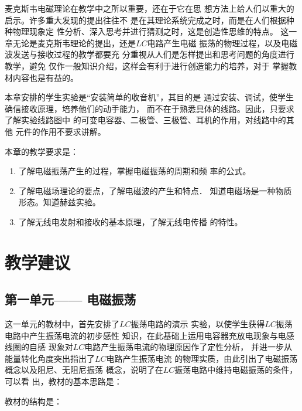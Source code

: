 麦克斯韦电磁理论在教学中之所以重要，还在于它在思
想方法上给人们以重大的启示。许多重大发现的提出往往不
是在其理论系统完成之时，而是在人们根据种种物理现象定
性分析、深入思考并进行猜测之时，这是创造性思维的特点。
这一章无论是麦克斯韦理论的提出，还是$LC$电路产生电磁
振荡的物理过程，以及电磁波发送与接收过程的教学都要充
分重视从人们是怎样提出和思考问题的角度进行教学，避免
仅作一般知识介绍，这样会有利于进行创造能力的培养，对于
掌握教材内容也是有益的。

本章安排的学生实验是“安装简单的收音机”，其目的是
通过安装、调试，使学生确信接收原理，培养他们的动手能力，
而不在于熟悉具体的线路。因此，只要求了解实验线路图中
的可变电容器、二极管、三极管、耳机的作用，对线路中的其他
元件的作用不要求讲解。

本章的教学要求是：
\begin{enumerate}
\item 了解电磁振荡产生的过程，掌握电磁振荡的周期和频
率的公式。
\item 了解电磁场理论的要点，了解电磁波的产生和特点．
知道电磁场是一种物质形态。知道赫兹实验。
\item 了解无线电发射和接收的基本原理，了解无线电传播
的特性。
\end{enumerate}

\section{教学建议}
\subsection{第一单元—— 电磁振荡}
这一单元的教材中，首先安排了$LC$振荡电路的演示
实验，以使学生获得$LC$振荡电路中产生振荡电流的初步感性
知识，在此基础上运用电容器充放电现象与电感线圈的自感
现象对$LC$电路产生振荡电流的物理原因作了定性分析，
并进一步从能量转化角度突出指出了$LC$电路产生振荡电流
的物理实质，由此引出了电磁振荡概念以及阻尼、无阻尼振荡
概念，说明了在$LC$振荡电路中维持电磁振荡的条件，可以看
出，教材的基本思路是：
\begin{center}
\end{center}
教材的结构是：
\begin{center}
\end{center}


